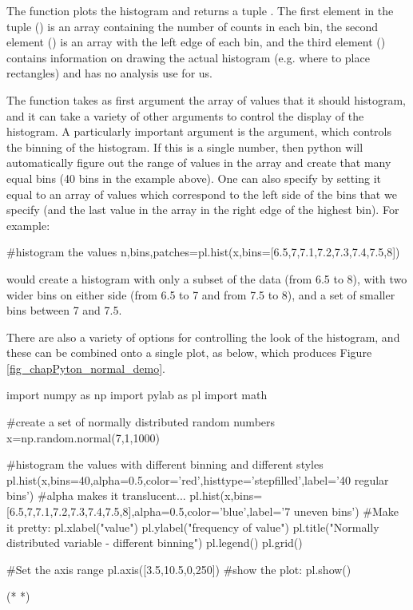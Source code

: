 The  function plots the histogram and returns a tuple . The first element in the tuple () is an array containing the number of counts in each bin, the second element () is an array with the left edge of each bin, and the third element () contains information on drawing the actual histogram (e.g. where to place rectangles) and has no analysis use for us.

The  function takes as first argument the array of values that it should histogram, and it can take a variety of other arguments to control the display of the histogram. A particularly important argument is the  argument, which controls the binning of the histogram. If this is a single number, then python will automatically figure out the range of values in the array and create that many equal bins (40 bins in the example above). One can also specify  by setting it equal to an array of values which correspond to the left side of the bins that we specify (and the last value in the array in the right edge of the highest bin). For example:
\begin{python}[caption = Making a histogram with customized bins]
#histogram the values
n,bins,patches=pl.hist(x,bins=[6.5,7,7.1,7.2,7.3,7.4,7.5,8])
\end{python}
would create a histogram with only a subset of the data (from 6.5 to 8), with two wider bins on either side (from 6.5 to 7 and from 7.5 to 8), and a set of smaller bins between 7 and 7.5.

There are also a variety of options for controlling the look of the histogram, and these can be combined onto a single plot, as below, which produces Figure \ref{fig_chapPyton_normal_demo}.
\begin{python}[caption = Plotting multiple histograms]
import numpy as np
import pylab as pl
import math 

#create a set of normally distributed random numbers
x=np.random.normal(7,1,1000)

#histogram the values with different binning and different styles
pl.hist(x,bins=40,alpha=0.5,color='red',histtype='stepfilled',label='40 regular bins') #alpha makes it translucent...
pl.hist(x,bins=[6.5,7,7.1,7.2,7.3,7.4,7.5,8],alpha=0.5,color='blue',label='7 uneven bins')
#Make it pretty:
pl.xlabel("value")
pl.ylabel("frequency of value")
pl.title("Normally distributed variable - different binning")
pl.legend()
pl.grid()

#Set the axis range
pl.axis([3.5,10.5,0,250])
#show the plot:
pl.show()
\end{python}
\begin{poutput}
(*  *)
\end{poutput}

